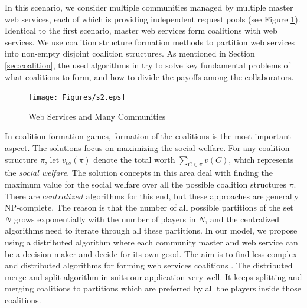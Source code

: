 In this scenario, we consider multiple communities managed by
multiple master web services, each of which is providing
independent request pools (see Figure \ref{fig_sim2}). Identical
to the first scenario, master web services form coalitions with
web services. We use coalition structure formation methods to
partition web services into non-empty disjoint coalition
structures. As mentioned in Section \ref{sec:coalition}, the used
algorithms in \cite{Sandholm:1999:CSG:317145.317152,DBLP:conf/ijcai/GrecoMPS11,DBLP:conf/ijcai/RahwanMJ11} try to
solve key fundamental problems of what coalitions to form, and how
to divide the payoffs among the collaborators.

\begin{figure}[!t]
\centering
\texttt{[image: Figures/s2.eps]}
\caption{Web Services and Many Communities}
\label{fig_sim2}
\end{figure}

In coalition-formation games, formation of the coalitions is the
most important aspect. The solutions focus on maximizing the
social welfare. For any coalition structure $\pi$, let
$v_{cs}(\pi)$ denote the total worth $\sum_{C \in \pi}{v(C)}$,
which represents the \emph{social welfare}. The solution concepts
in this area deal with finding the maximum value for the social
welfare over all the possible coalition structures $\pi$. There
are $centralized$ algorithms for this end, but these approaches
are generally NP-complete. The reason is that the number of all
possible partitions of the set $N$ grows exponentially with the
number of players in $N$, and the centralized algorithms need to
iterate through all these partitions.
In our model, we propose using a distributed algorithm where each
community master and web service can be a decision maker and
decide for its own good. The aim is to find less complex and
distributed algorithms for forming web services coalitions
\cite{DBLP:journals/igtr/AptW09,Dieckmann02dynamiccoalition,ray2007game}.
The distributed merge-and-split algorithm in
\cite{DBLP:journals/igtr/AptW09} suits our application very well.
It keeps splitting and merging coalitions to partitions which are
preferred by all the players inside those coalitions.

